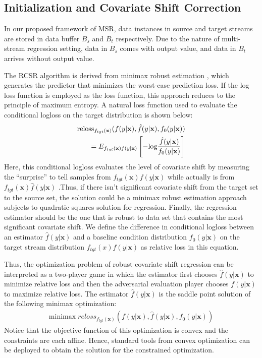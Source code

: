 \documentclass[conference,compsoc]{IEEEtran}
\begin{document}
\subsection{Initialization and Covariate Shift Correction}
In our proposed framework of MSR, data instances in source and target streams are stored in data buffer $B_s$ and $B_t$ respectively. Due to the nature of multi-stream regression setting, data in $B_s$ comes with output value, and data in $B_t$ arrives without output value. 

The RCSR algorithm is derived from minimax 
robust estimation \cite{chen}, which generates the predictor that minimizes the worst-case prediction loss. If the log loss function is employed as the loss 
function, this approach reduces to the principle of maximum entropy.
A natural loss function used to evaluate the conditional logloss on the target distribution is shown below:
\begin{equation}
\begin{split}
	\mathrm{reloss}_{f_{tgt}(\textbf{x})}(f(y|\textbf{\textbf{x}}), \hat{f}(y|\textbf{x}), f_0(y|\textbf{x})) \\
    = E_{f_{tgt}(\textbf{x})f(y|\textbf{x})}\left[-\mathrm{log}\frac{\hat{f}(y|\textbf{x})}{{f}_0(y|\textbf{x})}\right] %
\end{split}
\end{equation}
Here, this conditional logloss evaluates the level of
covariate shift by measuring the ``surprise'' to tell samples from
$f_{tgt}(\textbf{x})f(y|\textbf{x})$ while actually is from $f_{tgt}(\textbf{x})\hat{f}
(y|\textbf{x})$ \cite{Lafferty01}.Thus, if there isn't significant 
covariate shift from the target set to the source set, the
solution could be a minimax robust estimation approach subjects to
quadratic squares solution for regression. Finally, the
regression estimator should be the one that is robust to data set that contains the most significant covariate shift. We define the difference in conditional logloss between an estimator $\hat{f}(y|\textbf{x})$ and a baseline condition distribution $f_0(y|\textbf{x})$ on the target stream distribution $f_{tgt}(x)f(y|\textbf{x})$ as relative loss in this equation.

Thus, the optimization problem of robust covariate shift regression can be interpreted as a two-player game in which the estimator first chooses $\hat{f}(y|\textbf{x})$ to minimize relative loss and then the adversarial evaluation player chooses $f(y|\textbf{x})$ to maximize relative loss. The estimator $\hat{f}(y|\textbf{x})$ is the saddle point solution of the following minimax optimization:
\begin{equation}
\begin{split}
	\mathrm{minimax} \; reloss_{f_{tgt}(\textbf{x})}(f(y|\textbf{x}), \hat{f}(y|\textbf{x}), f_0(y|\textbf{x}))
\end{split}
\end{equation}
Notice that the objective function of this optimization is convex and the constraints are each affine. Hence, standard tools from convex optimization can be deployed to obtain the solution for the constrained optimization.
\end{document}
